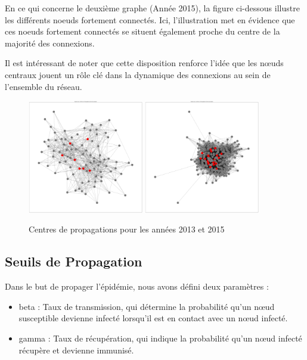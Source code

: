 \documentclass{article}
\begin{document}
En ce qui concerne le deuxième graphe (Année 2015), la figure ci-dessous illustre les différents noeuds fortement connectés. Ici, l'illustration met en évidence que ces noeuds fortement connectés se situent également proche du centre de la majorité des connexions.

Il est intéressant de noter que cette disposition renforce l'idée que les nœuds centraux jouent un rôle clé dans la dynamique des connexions au sein de l'ensemble du réseau.

\begin{figure}[!h]
    \centering
    \includegraphics[width=0.45\textwidth]{assets/epidemiologie/centre_propa_2013}
    \hfill
    \includegraphics[width=0.45\textwidth]{assets/epidemiologie/centre_propa_2015}
    \caption{Centres de propagations pour les années 2013 et 2015}
    \label{fig:centre_propa_parallel}
\end{figure}

\clearpage
\newpage
\subsection{Seuils de Propagation}

\noindent
Dans le but de propager l'épidémie, nous avons défini deux paramètres :
\begin{itemize}
    \item beta : Taux de transmission, qui détermine la probabilité qu'un nœud susceptible devienne infecté lorsqu'il est en contact avec un nœud infecté.
    \item gamma : Taux de récupération, qui indique la probabilité qu'un nœud infecté récupère et devienne immunisé. \\
\end{itemize}
\end{document}
